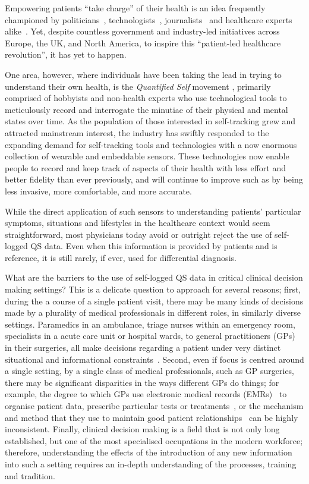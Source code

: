 \documentclass{sigchi}
\begin{document}
Empowering patients ``take charge'' of their health is an idea frequently championed by politicians~\cite{brown, obama}, technologists~\cite{ihealth}, journalists~\cite{goetz} and healthcare experts alike~\cite{swan2012health}.  Yet, despite countless government and industry-led initiatives across Europe, the UK, and North America, to inspire this ``patient-led healthcare revolution'', it has yet to happen.  

One area, however, where individuals have been taking the lead in trying to understand their own health, is the \emph{Quantified Self} movement \cite{}, primarily comprised of hobbyists and non-health experts who use technological tools to meticulously record and interrogate the minutiae of their physical and mental states over time.   As the population of those interested in self-tracking grew and attracted mainstream interest, the industry has swiftly responded to the expanding demand for self-tracking tools and technologies with a now enormous collection of wearable and embeddable sensors.  These technologies now enable people to record and keep track of aspects of their health with less effort and better fidelity than ever previously, and will continue to improve such as by being less invasive, more comfortable, and more accurate.

While the direct application of such sensors to understanding patients' particular symptoms, situations and lifestyles in the healthcare context would seem straightforward, most physicians today avoid or outright reject the use of self-logged QS data. Even when this information is provided by patients and is reference, it is still rarely, if ever, used for differential diagnosis.  

What are the barriers to the use of self-logged QS data in critical clinical decision making settings?  This is a delicate question to approach for several reasons; first, during the a course of a single patient visit, there may be many kinds of decisions made by a plurality of medical professionals in different roles, in similarly diverse settings.   Paramedics in an ambulance, triage nurses within an emergency room, specialists in a acute care unit or hospital wards, to general practitioners (GPs) in their surgeries, all make decisions regarding a patient under very distinct situational and informational constraints~\cite{croskerry}. Second, even if focus is centred around a single setting, by a single class of medical professionals, such as GP surgeries, there may be significant disparities in the ways different GPs do things; for example, the degree to which GPs use electronic medical records (EMRs)~\cite{hunt} to organise patient data, prescribe particular tests or treatments~\cite{}, or the mechanism and method that they use to maintain good patient relationships~\cite{} can be highly inconsistent. Finally, clinical decision making is a field that is not only long established, but one of the most specialised occupations in the modern workforce; therefore, understanding the effects of the introduction of any new information into such a setting requires an in-depth understanding of the processes, training and tradition.
\end{document}
